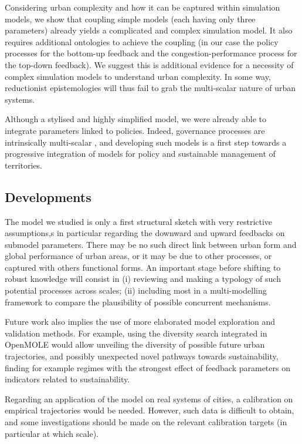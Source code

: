 \documentclass[referee,lineno,pdflatex,sn-apa]{sn-jnl}
\begin{document}
Considering urban complexity and how it can be captured within simulation models, we show that coupling simple models (each having only three parameters) already yields a complicated and complex simulation model. It also requires additional ontologies to achieve the coupling (in our case the policy processes for the bottom-up feedback and the congestion-performance process for the top-down feedback). We suggest this is additional evidence for a necessity of complex simulation models to understand urban complexity. In some way, reductionist epistemologies will thus fail to grab the multi-scalar nature of urban systems.

Although a stylised and highly simplified model, we were already able to integrate parameters linked to policies. Indeed, governance processes are intrinsically multi-scalar \citep{liao2017ouverture}, and developing such models is a first step towards a progressive integration of models for policy and sustainable management of territories.


\subsection{Developments}

The model we studied is only a first structural sketch with very restrictive assumptions,s in particular regarding the downward and upward feedbacks on submodel parameters. There may be no such direct link between urban form and global performance of urban areas, or it may be due to other processes, or captured with others functional forms. An important stage before shifting to robust knowledge will consist in (i) reviewing and making a typology of such potential processes across scales; (ii) including most in a multi-modelling framework to compare the plausibility of possible concurrent mechanisms.

Future work also implies the use of more elaborated model exploration and validation methods. For example, using the diversity search integrated in OpenMOLE \citep{reuillon2013openmole} would allow unveiling the diversity of possible future urban trajectories, and possibly unexpected novel pathways towards sustainability, finding for example regimes with the strongest effect of feedback parameters on indicators related to sustainability.

Regarding an application of the model on real systems of cities, a calibration on empirical trajectories would be needed. However, such data is difficult to obtain, and some investigations should be made on the relevant calibration targets (in particular at which scale).
\end{document}
